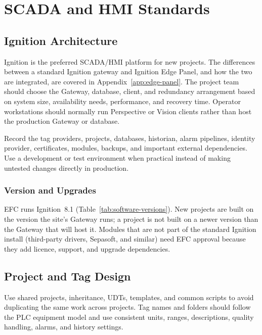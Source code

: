 \chapter{SCADA and HMI Standards}\label{ch:scada}
\section{Ignition Architecture}
Ignition is the preferred SCADA/HMI platform for new projects. The differences between a standard Ignition gateway and Ignition Edge Panel, and how the two are integrated, are covered in Appendix~\ref{app:edge-panel}. The project team should choose the Gateway, database, client, and redundancy arrangement based on system size, availability needs, performance, and recovery time. Operator workstations should normally run Perspective or Vision clients rather than host the production Gateway or database.

Record the tag providers, projects, databases, historian, alarm pipelines, identity provider, certificates, modules, backups, and important external dependencies. Use a development or test environment when practical instead of making untested changes directly in production.

\subsection[Version and Upgrades]{Version and Upgrades \newmark}\label{sec:ignition-version}
EFC runs Ignition~8.1 (Table~\ref{tab:software-versions}). New projects are built on the version the site's Gateway runs; a project is not built on a newer version than the Gateway that will host it. Modules that are not part of the standard Ignition install (third-party drivers, Sepasoft, and similar) need EFC approval because they add licence, support, and upgrade dependencies.

\section{Project and Tag Design}
Use shared projects, inheritance, UDTs, templates, and common scripts to avoid duplicating the same work across projects. Tag names and folders should follow the PLC equipment model and use consistent units, ranges, descriptions, quality handling, alarms, and history settings.

